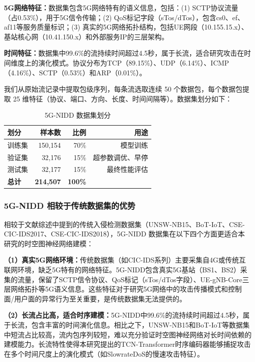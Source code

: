 \textbf{5G网络特征：}数据集包含5G网络特有的语义信息，包括：(1) SCTP协议流量（占0.53\%），用于5G信令传输；(2) QoS标记字段（sTos/dTos），包含cs0、ef、af11等服务质量标识；(3) 真实的5G网络拓扑结构，包括UE网段（10.155.15.x）、基站核心网（10.41.150.x）和外部服务IP的三层架构。

\textbf{时间特征：}数据集中99.6\%的流持续时间超过4.5秒，属于长流，适合研究攻击在时间维度上的演化模式。协议分布为TCP（89.15\%）、UDP（6.14\%）、ICMP（4.16\%）、SCTP（0.53\%）和ARP（0.01\%）。

我们从原始流记录中提取包级序列，每条流选取连续 50 个数据包，每个数据包提取 25 维特征（协议、端口、方向、长度、时间间隔等）。数据集划分如下：

\begin{table}[h]
\centering
\begin{tabular}{lrrr}
\hline
\textbf{划分} & \textbf{样本数} & \textbf{比例} & \textbf{用途} \\
\hline
训练集 & 150,154 & 70\% & 模型训练 \\
验证集 & 32,176 & 15\% & 超参数调优、早停 \\
测试集 & 32,177 & 15\% & 最终性能评估 \\
\hline
\textbf{总计} & \textbf{214,507} & \textbf{100\%} & \\
\hline
\end{tabular}
\caption{5G-NIDD 数据集划分}
\end{table}

\subsubsection{5G-NIDD 相较于传统数据集的优势}

相较于文献综述中提到的传统入侵检测数据集（UNSW-NB15、BoT-IoT、CSE-CIC-IDS2017、CSE-CIC-IDS2018），5G-NIDD 数据集在以下四个方面更适合本研究的时空图神经网络建模：

\textbf{（1）真实5G网络环境：}传统数据集（如CIC-IDS系列）主要采集自4G或传统互联网环境，缺乏5G特有的网络特征。5G-NIDD包含真实5G基站（BS1、BS2）采集的流量，保留了SCTP信令协议、QoS标记（sTos/dTos字段）、UE-gNB-Core三层网络拓扑等5G语义信息。这些特征对于研究5G网络中的攻击传播模式和控制面/用户面的异常行为至关重要，是传统数据集无法提供的。

\textbf{（2）长流占比高，适合时序建模：}5G-NIDD中99.6\%的流持续时间超过4.5秒，属于长流，包含丰富的时间演化信息。相比之下，UNSW-NB15和BoT-IoT等数据集中短流占比较高，流内包序列较短，难以充分验证时空图神经网络对长时间依赖的建模能力。长流特性使得本研究提出的TCN-Transformer时序编码器能够捕捉攻击在多个时间尺度上的演化模式（如SlowrateDoS的慢速攻击特征）。

